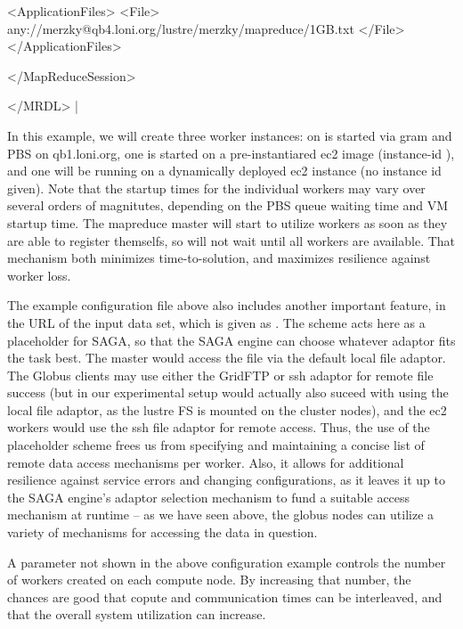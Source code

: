       <ApplicationFiles>
        <File> any://merzky@qb4.loni.org/lustre/merzky/mapreduce/1GB.txt </File>
      </ApplicationFiles>
  
    </MapReduceSession>
  
  </MRDL>
 |

 In this example, we will create three worker instances: on is started
 via gram and PBS on qb1.loni.org, one is started on a
 pre-instantiared ec2 image (instance-id ), and one will
 be running on a dynamically deployed ec2 instance (no instance id
 given).  Note that the startup times for the individual workers may
 vary over several orders of magnitutes, depending on the PBS queue
 waiting time and VM startup time.  The mapreduce master will start to
 utilize workers as soon as they are able to register themselfs, so
 will not wait until all workers are available.  That mechanism both
 minimizes time-to-solution, and maximizes resilience against worker
 loss.

 The example configuration file above also includes another important
 feature, in the  URL of the input data set, which is given as
 .  The
 scheme  acts here as a placeholder for SAGA, so that the SAGA
 engine can choose whatever adaptor fits the task best.  The master
 would access the file via the default local file adaptor.  The Globus
 clients may use either the GridFTP or ssh adaptor for remote file
 success (but in our experimental setup would actually also suceed
 with using the local file adaptor, as the lustre FS is mounted on the
 cluster nodes), and the ec2 workers would use the ssh file adaptor
 for remote access.  Thus, the use of the placeholder scheme frees us
 from specifying and maintaining a concise list of remote data access
 mechanisms per worker.  Also, it allows for additional resilience
 against service errors and changing configurations, as it leaves it
 up to the SAGA engine's adaptor selection mechanism to fund a
 suitable access mechanism at runtime -- as we have seen above, the
 globus nodes can utilize a variety of mechanisms for accessing the
 data in question.

 A parameter not shown in the above configuration example controls the
 number of workers created on each compute node.  By increasing that
 number, the chances are good that copute and communication times can
 be interleaved, and that the overall system utilization can increase.
 

